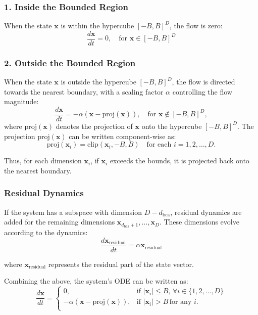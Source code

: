 \documentclass{article}
\theoremstyle{definition} \newtheorem{definition}{Definition}  \newtheorem{example}{Example}
\theoremstyle{remark} \newtheorem{remark}{Remark}
\newcounter{ct}
\begin{document}
\subsubsection*{1. Inside the Bounded Region}
When the state \( \mathbf{x} \) is within the hypercube \( [-B, B]^D \), the flow is zero:
\[
\frac{d \mathbf{x}}{dt} = 0, \quad \text{for } \mathbf{x} \in [-B, B]^D
\]

\subsubsection*{2. Outside the Bounded Region}
When the state \( \mathbf{x} \) is outside the hypercube \( [-B, B]^D \), the flow is directed towards the nearest boundary, with a scaling factor \( \alpha \) controlling the flow magnitude:
\[
\frac{d \mathbf{x}}{dt} = -\alpha (\mathbf{x} - \text{proj}(\mathbf{x})), \quad \text{for } \mathbf{x} \notin [-B, B]^D,
\]
where \( \text{proj}(\mathbf{x}) \) denotes the projection of \( \mathbf{x} \) onto the hypercube \( [-B, B]^D \). The projection \( \text{proj}(\mathbf{x}) \) can be written component-wise as:
\[
\text{proj}(\mathbf{x}_i) = \text{clip}(\mathbf{x}_i, -B, B) \quad \text{for each } i = 1, 2, \dots, D.
\]

Thus, for each dimension \( \mathbf{x}_i \), if \( \mathbf{x}_i \) exceeds the bounds, it is projected back onto the nearest boundary.

\subsubsection*{Residual Dynamics}
If the system has a subspace with dimension \( D - d_{\text{bca}} \), residual dynamics are added for the remaining dimensions \( \mathbf{x}_{d_{\text{bca}}+1}, \dots, \mathbf{x}_D \). These dimensions evolve according to the dynamics:
\[
\frac{d \mathbf{x}_{\text{residual}}}{dt} = \alpha \mathbf{x}_{\text{residual}}
\]

where \( \mathbf{x}_{\text{residual}} \) represents the residual part of the state vector.

Combining the above, the system's ODE can be written as:
\[
\frac{d \mathbf{x}}{dt} =
\begin{cases}
0, & \text{if } |\mathbf{x}_i| \leq B, \, \forall i \in \{1, 2, \dots, D\} \\
-\alpha (\mathbf{x} - \text{proj}(\mathbf{x})), & \text{if } |\mathbf{x}_i| > B \, \text{for any } i. \\
\end{cases}
\]
\end{document}
